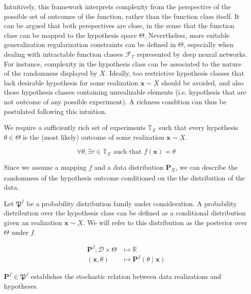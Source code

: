 Intuitively, this framework interprets complexity from the perspective of the possible
set of outcomes of the function, rather than the function class itself. It can be argued
that both perspectives are close, in the sense that the function class can be mapped 
to the hypothesis space $\Theta$. Nevertheless, more suitable generalization regularization
constraints can be defined in $\Theta$, especially when dealing with intractable
function classes $\mathcal{F}_{\Gamma}$ represented by deep neural networks. \\

For instance, complexity in the hypothesis class can be associated to the nature of the
randomness displayed by $X$. Ideally, too restrictive hypothesis classes that lack desirable
hypothesis for some realization $\bm{x} \sim \underbar{X}$ should be avoided, and also those hypothesis
classes containing unrealizable elements (i.e. hypothesis that are not outcome of
any possible experiment). A richness condition can thus be postulated following
this intuition. \\

\begin{definition}
    We require a
    sufficiently rich set of experiments $\mathbb{T}_{\mathcal{X}}$ such that every hypothesis $\theta \in \Theta$
    is the (most likely) outcome of some realization $\bm{x} \sim \underbar{X}$.

    $$
    \forall \theta, \exists \tau \in \mathbb{T}_{\mathcal{X}} \text{ such that } f(\bm{x}) = \theta
    $$
\end{definition}


Since we assume a mapping $f$ and a data distribution $\mathbf{P}_{\underbar{X}}$, we can describe
the randomness of the hypothesis outcome conditioned on the the distribution of the data.

\begin{definition}[Posterior]
    Let $\mathfrak{P}^f$ be a probability distribution family under consideration.
    A probability distribution over the hypothesis class can be defined as a 
    conditional distribution given an realization $\bm{x} \sim \underbar{X}$. 
    We will refer to this distribution as the posterior over $\Theta$ under $f$.

    $$
        \begin{aligned}
            \mathbf{P}^f: \mathcal{D} \times \Theta & \longmapsto \mathbb{R} \\
            (\bm{x}, \theta) & \longmapsto \mathbf{P}^f (\theta \mid \bm{x})
        \end{aligned}
    $$

    $\mathbf{P}^f \in \mathfrak{P}^f$ establishes the stochastic relation between data realizations and hypotheses.
    
\end{definition}

